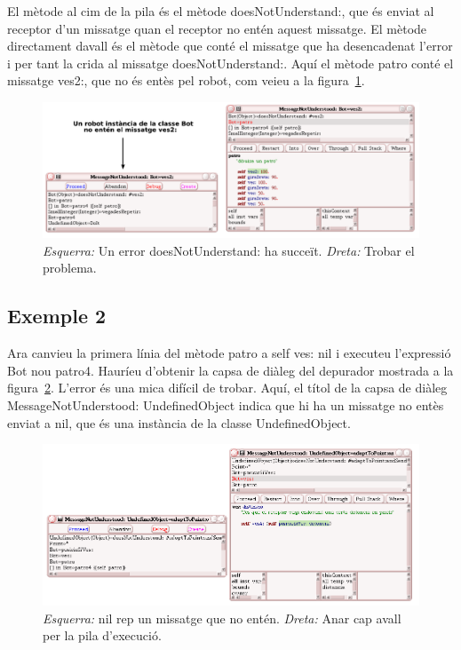 El mètode al cim de la pila és el mètode \textsf{doesNotUnderstand:}, que és enviat al receptor d'un missatge quan el receptor no entén aquest missatge. El mètode directament davall és el mètode que conté el missatge que ha desencadenat l'error i per tant la crida al missatge \textsf{doesNotUnderstand:}. Aquí el mètode \textsf{patro} conté el missatge \textsf{ves2:}, que no és entès pel robot, com veieu a la figura~\ref{fig1510}.
\begin{figure}[h]
\begin{center}
\includegraphics[scale=0.5]{Imatges/figura15-10.pdf}
\end{center}
\caption{\emph{Esquerra:} Un error \textsf{\upshape doesNotUnderstand:} ha succeït. 
\emph{Dreta:} Trobar el problema.}
\label{fig1510}
\end{figure}

\subsection{Exemple 2}
Ara canvieu la primera línia del mètode \textsf{patro} a \textsf{self ves: nil} i executeu l'expressió \textsf{Bot nou patro4}. Hauríeu d'obtenir la capsa de diàleg del depurador mostrada a la figura~\ref{fig1511}. L'error és una mica difícil de trobar. Aquí, el títol de la capsa de diàleg \textsf{MessageNotUnderstood: UndefinedObject} indica que hi ha un missatge no entès enviat a \textsf{nil}, que és una instància de la classe \textsf{UndefinedObject}.
\begin{figure}[h!]
\begin{center}
\includegraphics[scale=0.38]{Imatges/figura15-11.png}
\end{center}
\caption{\emph{Esquerra:} \textsf{\upshape nil} rep un missatge que no entén. 
\emph{Dreta:} Anar cap avall per la pila d'execució.}
\label{fig1511}
\end{figure}

